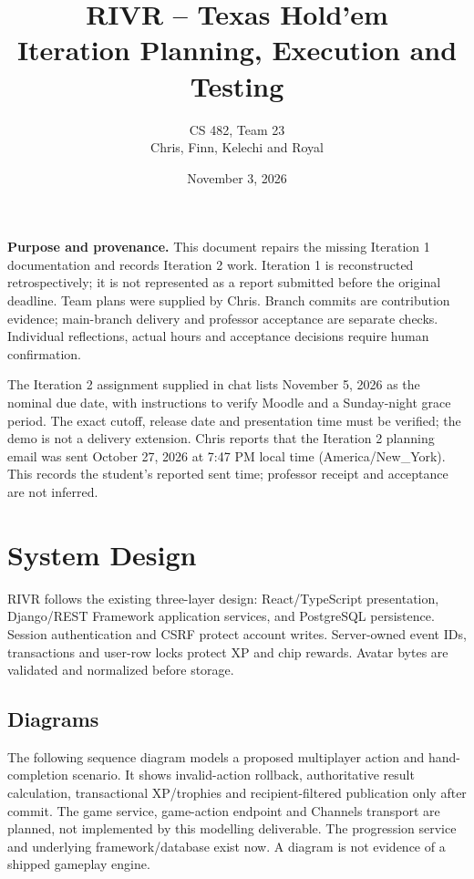 \documentclass[11pt,a4paper]{article}
\title{RIVR -- Texas Hold'em\\Iteration Planning, Execution and Testing}
\author{CS 482, Team 23\\Chris, Finn, Kelechi and Royal}
\date{November 3, 2026}
\begin{document}
\maketitle
\textbf{Purpose and provenance.} This document repairs the missing Iteration 1 documentation and records Iteration 2 work. Iteration 1 is reconstructed retrospectively; it is not represented as a report submitted before the original deadline. Team plans were supplied by Chris. Branch commits are contribution evidence; main-branch delivery and professor acceptance are separate checks. Individual reflections, actual hours and acceptance decisions require human confirmation.

The Iteration 2 assignment supplied in chat lists November 5, 2026 as the nominal due date, with instructions to verify Moodle and a Sunday-night grace period. The exact cutoff, release date and presentation time must be verified; the demo is not a delivery extension. Chris reports that the Iteration 2 planning email was sent October 27, 2026 at 7:47 PM local time (America/New\_York). This records the student's reported sent time; professor receipt and acceptance are not inferred.

\setcounter{tocdepth}{1}
{\small\tableofcontents}
\newpage
\section{System Design}
RIVR follows the existing three-layer design: React/TypeScript presentation, Django/REST Framework application services, and PostgreSQL persistence. Session authentication and CSRF protect account writes. Server-owned event IDs, transactions and user-row locks protect XP and chip rewards. Avatar bytes are validated and normalized before storage.

\subsection{Diagrams}
The following sequence diagram models a proposed multiplayer action and hand-completion scenario. It shows invalid-action rollback, authoritative result calculation, transactional XP/trophies and recipient-filtered publication only after commit. The game service, game-action endpoint and Channels transport are planned, not implemented by this modelling deliverable. The progression service and underlying framework/database exist now. A diagram is not evidence of a shipped gameplay engine.
\end{document}
